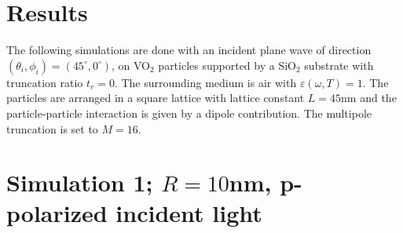 \section{Results}
The following simulations are done with an incident plane wave of direction 
$(\theta_i,\phi_i) = (45^{\circ},0^{\circ})$, on VO$_2$ particles supported by a SiO$_2$ substrate
with truncation ratio $t_r = 0$. The surrounding medium is air with $\varepsilon(\omega,T) = 1$.
The particles are arranged in a square lattice with lattice constant $L = 45$nm and the
particle-particle interaction is given by a dipole contribution. The multipole truncation
is set to $M = 16$.
\section{Simulation 1; $R = 10$nm, p-polarized incident light}
%
